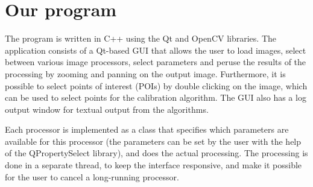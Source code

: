 \section{Our program}
The program is written in C++ using the Qt and OpenCV libraries. The
application consists of a Qt-based GUI that allows the user to load
images, select between various image processors, select parameters and
peruse the results of the processing by zooming and panning on the
output image. Furthermore, it is possible to select points of interest
(POIs) by double clicking on the image, which can be used to select
points for the calibration algorithm. The GUI also has a log output
window for textual output from the algorithms.

Each processor is implemented as a class that specifies which
parameters are available for this processor (the parameters can be set
by the user with the help of the QPropertySelect library), and does
the actual processing. The processing is done in a separate thread, to
keep the interface responsive, and make it possible for the user to
cancel a long-running processor.






